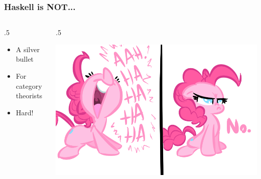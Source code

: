 \documentclass[17pt]{beamer}
\renewcommand{\(}[1]{\begin{columns}[#1]}
\renewcommand{\)}{\end{columns}}
\newcommand{\<}[1]{\begin{column}{#1}}
\renewcommand{\>}{\end{column}}
\begin{document}
\begin{frame}
  \frametitle{Haskell is NOT...}
  \({c}
  \<{.5\textwidth}
  \begin{center}
    \begin{itemize}
    \item A silver bullet
    \item For category theorists
    \item<2-> Hard! 
    \end{itemize}
  \end{center}
  \>
  \<{.5\textwidth}
  \begin{center}
    \includegraphics[width=\textwidth]{img/no}
  \end{center}
  \>
  \)
\end{frame}
\end{document}
